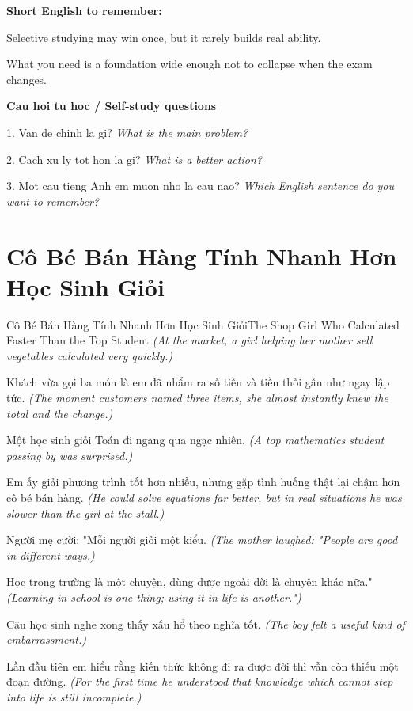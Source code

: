 \begin{ghinhoanh}
\textbf{Short English to remember:}

Selective studying may win once, but it rarely builds real ability.

What you need is a foundation wide enough not to collapse when the exam changes.

\end{ghinhoanh}

\begin{tuhocnhanh}
\textbf{Cau hoi tu hoc / Self-study questions}

1. Van de chinh la gi? \textit{What is the main problem?}

2. Cach xu ly tot hon la gi? \textit{What is a better action?}

3. Mot cau tieng Anh em muon nho la cau nao? \textit{Which English sentence do you want to remember?}
\end{tuhocnhanh}
\ngancach

\section{Cô Bé Bán Hàng Tính Nhanh Hơn Học Sinh Giỏi}
\begin{truyen}{Cô Bé Bán Hàng Tính Nhanh Hơn Học Sinh Giỏi}{The Shop Girl Who Calculated Faster Than the Top Student}
\textit{(At the market, a girl helping her mother sell vegetables calculated very quickly.)}

Khách vừa gọi ba món là em đã nhẩm ra số tiền và tiền thối gần như ngay lập tức.
\textit{(The moment customers named three items, she almost instantly knew the total and the change.)}

Một học sinh giỏi Toán đi ngang qua ngạc nhiên.
\textit{(A top mathematics student passing by was surprised.)}

Em ấy giải phương trình tốt hơn nhiều, nhưng gặp tình huống thật lại chậm hơn cô bé bán hàng.
\textit{(He could solve equations far better, but in real situations he was slower than the girl at the stall.)}

Người mẹ cười: "Mỗi người giỏi một kiểu.
\textit{(The mother laughed: "People are good in different ways.)}

Học trong trường là một chuyện, dùng được ngoài đời là chuyện khác nữa."
\textit{(Learning in school is one thing; using it in life is another.")}

Cậu học sinh nghe xong thấy xấu hổ theo nghĩa tốt.
\textit{(The boy felt a useful kind of embarrassment.)}

Lần đầu tiên em hiểu rằng kiến thức không đi ra được đời thì vẫn còn thiếu một đoạn đường.
\textit{(For the first time he understood that knowledge which cannot step into life is still incomplete.)}

\end{truyen}


